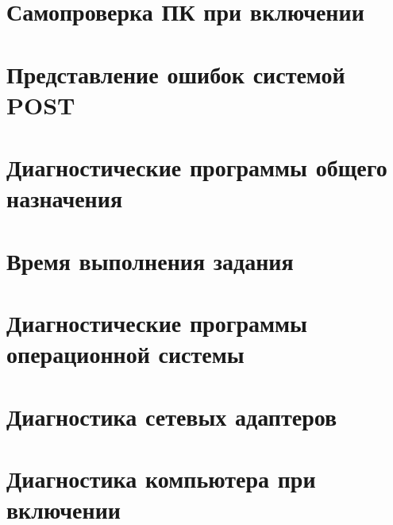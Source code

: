 \documentclass[
	a4paper,
	oneside,
	DIV = 14,
	fontsize = 14pt,
	headings = normal,
]{scrartcl}
\begin{document}
	\section{Самопроверка ПК при включении}

	\section{Представление ошибок системой POST}

	\section{Диагностические программы общего назначения}

	\section{Время выполнения задания}

	\section{Диагностические программы операционной системы}

	\section{Диагностика сетевых адаптеров}

	\section{Диагностика компьютера при включении}
\end{document}
